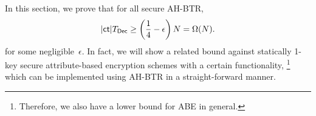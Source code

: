 In this section, we prove that for all secure AH-BTR,
\begin{align*}
|\ct|\TDec
\geq\left(\frac14-\epsilon\right)N
=\Omega(N).
\end{align*}
for some negligible~$\epsilon$.
In fact, we will show a related bound against statically 1-key secure attribute-based encryption schemes with a certain functionality,%
\footnote{Therefore, we also have a lower bound for ABE in general.}
which can be implemented using AH-BTR in a straight-forward manner.
